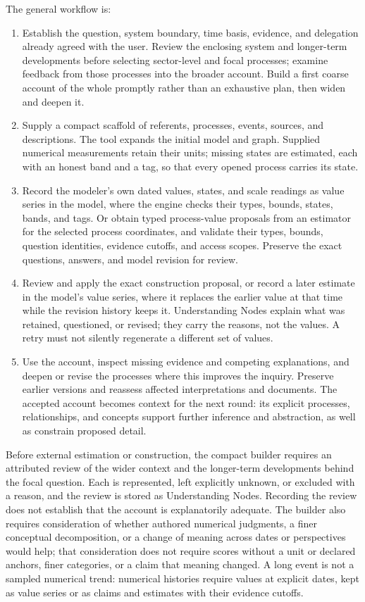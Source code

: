 \documentclass[11pt,a4paper]{article}
\begin{document}
The general workflow is:
\begin{enumerate}
  \item Establish the question, system boundary, time basis, evidence, and
  delegation already agreed with the user. Review the enclosing system and
  longer-term developments before selecting sector-level and focal processes;
  examine feedback from those processes into the broader account. Build a
  first coarse account of the whole promptly rather than an exhaustive plan,
  then widen and deepen it.
  \item Supply a compact scaffold of referents, processes, events, sources, and
  descriptions. The tool expands the initial model and graph. Supplied numerical
  measurements retain their units; missing states are estimated, each with an
  honest band and a tag, so that every opened process carries its state.
  \item Record the modeler's own dated values, states, and scale readings as
  value series in the model, where the engine checks their types, bounds,
  states, bands, and tags. Or obtain typed process-value proposals from an
  estimator for the selected process coordinates, and validate their types,
  bounds, question identities, evidence cutoffs, and access scopes. Preserve the exact questions, answers, and model revision for review.
  \item Review and apply the exact construction proposal, or record a later
  estimate in the model's value series, where it replaces the earlier value at
  that time while the revision history keeps it. Understanding Nodes explain
  what was retained, questioned, or revised; they carry the reasons, not the
  values. A retry must not silently regenerate
  a different set of values.
  \item Use the account, inspect missing evidence and competing explanations,
  and deepen or revise the processes where this improves the inquiry. Preserve
  earlier versions and reassess affected interpretations and documents. The
  accepted account becomes context for the next round: its explicit processes,
  relationships, and concepts support further inference and abstraction, as well
  as constrain proposed detail.
\end{enumerate}

Before external estimation or construction, the compact builder requires an
attributed review of the wider context and the longer-term developments behind
the focal question. Each is represented, left explicitly unknown, or excluded
with a reason, and the review is stored as Understanding Nodes. Recording the
review does not establish that the account is explanatorily adequate. The
builder also requires consideration of whether authored numerical judgments, a
finer conceptual decomposition, or a change of meaning across dates or
perspectives would help; that consideration does not require scores without a
unit or declared anchors, finer categories, or a claim that meaning changed. A long event is not a sampled
numerical trend: numerical histories require values at explicit dates, kept as
value series or as claims and estimates with their evidence cutoffs.
\end{document}
